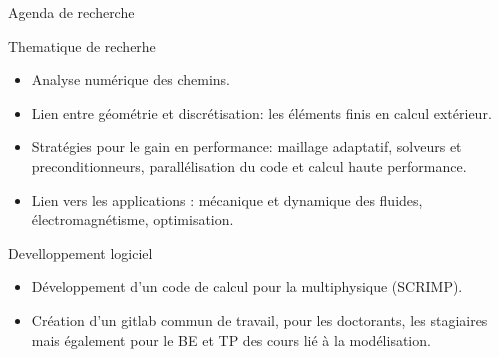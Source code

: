 \documentclass[aspectratio=169, french]{ISAE-Beamer}
\begin{document}
\begin{frame}{Agenda de recherche}
	
	\begin{block}{Thematique de recherhe}
		\begin{itemize}
			\item Analyse numérique des chemins.
			\item Lien entre géométrie et discrétisation: les éléments finis en calcul extérieur.
			\item Stratégies pour le gain en performance: maillage adaptatif, solveurs et preconditionneurs, parallélisation du code et calcul haute performance. 
			\item Lien vers les applications : mécanique et dynamique des fluides, électromagnétisme, optimisation.
		\end{itemize}

		
	\end{block}
	
	
	\begin{block}{Develloppement logiciel}
		\begin{itemize}
			\item Développement d'un code de calcul pour la multiphysique (SCRIMP).
			\item Création d'un gitlab commun de travail, pour les doctorants, les stagiaires mais également pour le BE et TP des cours lié à la modélisation.
		\end{itemize}	
		
	\end{block}
	
\end{frame}
\end{document}
